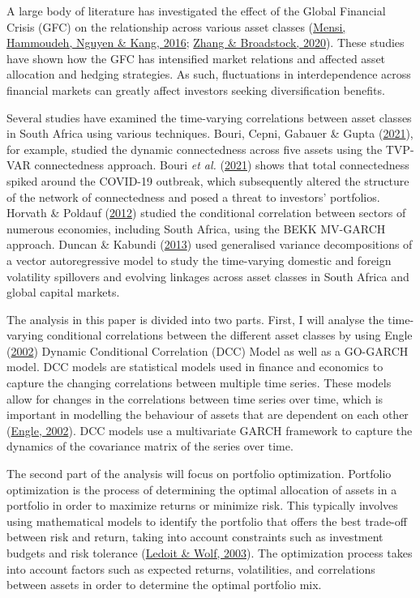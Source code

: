 \documentclass[11pt,preprint, authoryear]{elsarticle}
\numberwithin{equation}{section}
\numberwithin{figure}{section}
\numberwithin{table}{section}
\begin{document}
A large body of literature has investigated the effect of the Global
Financial Crisis (GFC) on the relationship across various asset classes
(\protect\hyperlink{ref-mensi2016global}{Mensi, Hammoudeh, Nguyen \&
Kang, 2016}; \protect\hyperlink{ref-zhang2020global}{Zhang \&
Broadstock, 2020}). These studies have shown how the GFC has intensified
market relations and affected asset allocation and hedging strategies.
As such, fluctuations in interdependence across financial markets can
greatly affect investors seeking diversification benefits.

Several studies have examined the time-varying correlations between
asset classes in South Africa using various techniques. Bouri, Cepni,
Gabauer \& Gupta (\protect\hyperlink{ref-bouri2021return}{2021}), for
example, studied the dynamic connectedness across five assets using the
TVP-VAR connectedness approach. Bouri \emph{et al.}
(\protect\hyperlink{ref-bouri2021return}{2021}) shows that total
connectedness spiked around the COVID-19 outbreak, which subsequently
altered the structure of the network of connectedness and posed a threat
to investors' portfolios. Horvath \& Poldauf
(\protect\hyperlink{ref-horvath2012international}{2012}) studied the
conditional correlation between sectors of numerous economies, including
South Africa, using the BEKK MV-GARCH approach. Duncan \& Kabundi
(\protect\hyperlink{ref-duncan2013domestic}{2013}) used generalised
variance decompositions of a vector autoregressive model to study the
time-varying domestic and foreign volatility spillovers and evolving
linkages across asset classes in South Africa and global capital
markets.

The analysis in this paper is divided into two parts. First, I will
analyse the time-varying conditional correlations between the different
asset classes by using Engle
(\protect\hyperlink{ref-engle2002dynamic}{2002}) Dynamic Conditional
Correlation (DCC) Model as well as a GO-GARCH model. DCC models are
statistical models used in finance and economics to capture the changing
correlations between multiple time series. These models allow for
changes in the correlations between time series over time, which is
important in modelling the behaviour of assets that are dependent on
each other (\protect\hyperlink{ref-engle2002dynamic}{Engle, 2002}). DCC
models use a multivariate GARCH framework to capture the dynamics of the
covariance matrix of the series over time.

The second part of the analysis will focus on portfolio optimization.
Portfolio optimization is the process of determining the optimal
allocation of assets in a portfolio in order to maximize returns or
minimize risk. This typically involves using mathematical models to
identify the portfolio that offers the best trade-off between risk and
return, taking into account constraints such as investment budgets and
risk tolerance (\protect\hyperlink{ref-ledoit2003improved}{Ledoit \&
Wolf, 2003}). The optimization process takes into account factors such
as expected returns, volatilities, and correlations between assets in
order to determine the optimal portfolio mix.
\end{document}
